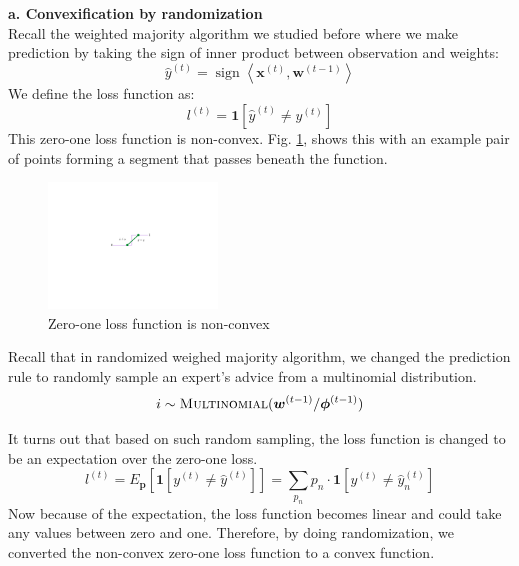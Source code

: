 \documentclass[11pt]{article}
\DeclareMathOperator{\sign}{sign}
\begin{document}
\begin{addmargin}[2em]{2em}

\textbf{a. Convexification by randomization}\\
Recall the weighted majority algorithm we studied before where we make prediction by taking the sign of inner product between observation and weights:
\begin{equation*}
    \hat{y}^{(t)} = \sign \left \langle \bm{x}^{(t)}, \bm{w}^{(t-1)} \right \rangle
    \label{eq:wma_pred}
\end{equation*}
We define the loss function as:
\begin{equation*}
    l^{(t)} = \mathbf{1}[\hat{y}^{(t)} \neq y^{(t)}]
\end{equation*}
This zero-one loss function is non-convex. Fig. \ref{fig:zero_one_loss}, shows this with an example pair of points forming a segment that passes beneath the function.

\begin{figure}[h]
    \centering
    \includegraphics[width=0.4\textwidth]{figure/zero_one_loss.pdf}
    \caption{Zero-one loss function is non-convex}
    \label{fig:zero_one_loss}
\end{figure}

Recall that in randomized weighed majority algorithm, we changed the prediction rule to randomly sample an expert's advice from a multinomial distribution.
\begin{equation*}
    i \sim \textsc{Multinomial} (\bm{w}^{(t-1)} / \bm{\phi}^{(t-1)})
\end{equation*}

It turns out that based on such random sampling, the loss function is changed to be an expectation over the zero-one loss.
\begin{equation*}
    l^{(t)} = E_{\bm{p}}\left[ \mathbf{1}[y^{(t)} \neq \hat{y}^{(t)}] \right] = \sum_{p_n} p_n \cdot \mathbf{1}[y^{(t)} \neq \hat{y}_n^{(t)}]
\end{equation*}
Now because of the expectation, the loss function becomes linear and could take any values between zero and one. Therefore, by doing randomization, we converted the non-convex zero-one loss function to a convex function.


\end{addmargin}
\end{document}
